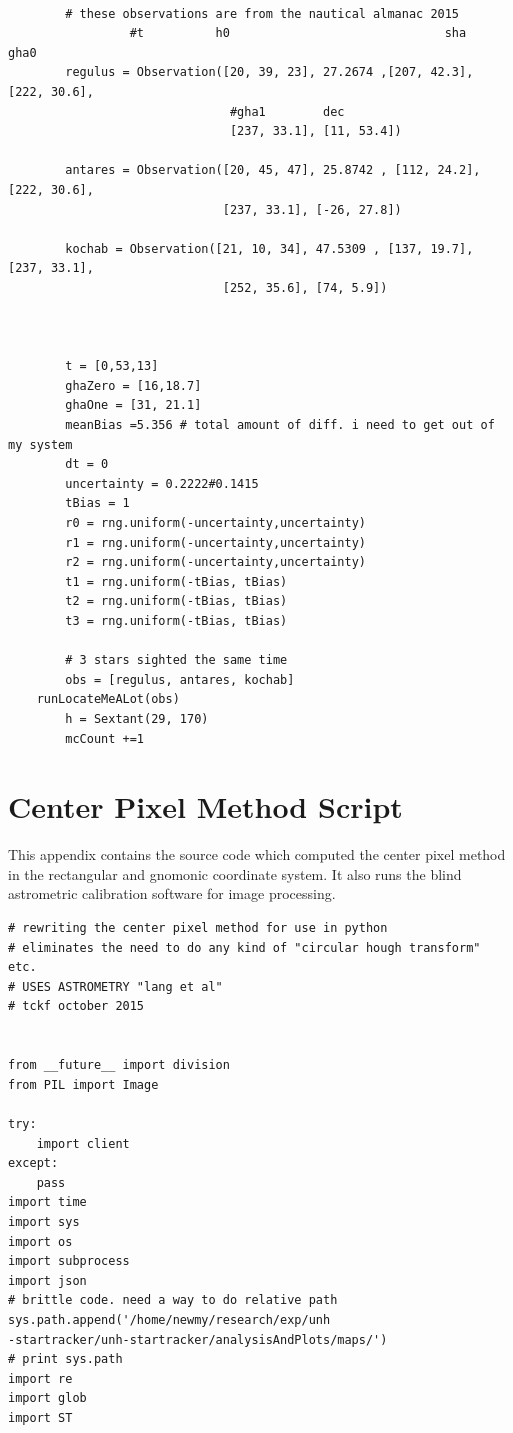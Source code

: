 \documentclass[12pt,a4paper]{book}
\begin{document}
\begin{appendices}
\begin{verbatim}
               
        # these observations are from the nautical almanac 2015        
                 #t          h0                              sha           gha0 
        regulus = Observation([20, 39, 23], 27.2674 ,[207, 42.3], [222, 30.6], 
                               #gha1        dec
                               [237, 33.1], [11, 53.4]) 

        antares = Observation([20, 45, 47], 25.8742 , [112, 24.2], [222, 30.6],
                              [237, 33.1], [-26, 27.8])

        kochab = Observation([21, 10, 34], 47.5309 , [137, 19.7], [237, 33.1],
                              [252, 35.6], [74, 5.9])



        t = [0,53,13]
        ghaZero = [16,18.7]
        ghaOne = [31, 21.1]
        meanBias =5.356 # total amount of diff. i need to get out of my system
        dt = 0
        uncertainty = 0.2222#0.1415
        tBias = 1
        r0 = rng.uniform(-uncertainty,uncertainty)
        r1 = rng.uniform(-uncertainty,uncertainty)
        r2 = rng.uniform(-uncertainty,uncertainty)
        t1 = rng.uniform(-tBias, tBias)
        t2 = rng.uniform(-tBias, tBias)
        t3 = rng.uniform(-tBias, tBias)

        # 3 stars sighted the same time
        obs = [regulus, antares, kochab]
	runLocateMeALot(obs)
        h = Sextant(29, 170)
        mcCount +=1
\end{verbatim}
\chapter{Center Pixel Method Script}
This appendix contains the source code which computed the center pixel method in the rectangular and gnomonic coordinate system.  It also runs the blind astrometric calibration software for image processing.
\begin{verbatim}
# rewriting the center pixel method for use in python
# eliminates the need to do any kind of "circular hough transform" etc.
# USES ASTROMETRY "lang et al" 
# tckf october 2015

 
from __future__ import division
from PIL import Image

try:
    import client
except:
    pass
import time
import sys
import os
import subprocess
import json
# brittle code. need a way to do relative path 
sys.path.append('/home/newmy/research/exp/unh
-startracker/unh-startracker/analysisAndPlots/maps/')
# print sys.path
import re
import glob
import ST


\end{verbatim}
\end{appendices}
\end{document}
